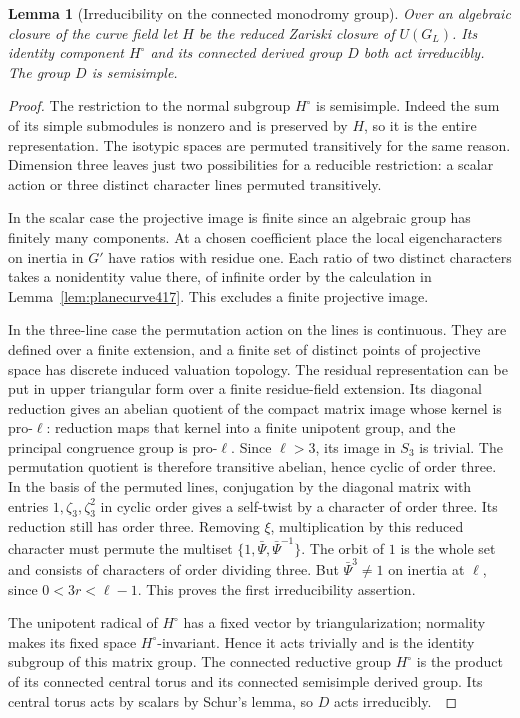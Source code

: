 \documentclass[a4paper,11pt]{article}
\newtheorem{lemma}[proposition]{Lemma}
\theoremstyle{definition}
\theoremstyle{remark}
\numberwithin{equation}{section}
\begin{document}
\begin{lemma}[Irreducibility on the connected monodromy group]\leavevmode
\label{lem:connectedthree418}
Over an algebraic closure of the curve field let \(H\) be the
reduced Zariski closure of \(U(G_L)\). Its identity component
\(H^\circ\) and its connected derived group \(D\) both act
irreducibly. The group \(D\) is semisimple.
\end{lemma}
\begin{proof}
The restriction to the normal subgroup \(H^\circ\) is
semisimple. Indeed the sum of its simple submodules is nonzero
and is preserved by \(H\), so it is the entire representation.
The isotypic spaces are permuted transitively for the same
reason. Dimension three leaves just two possibilities for a
reducible restriction: a scalar action or three distinct
character lines permuted transitively.

In the scalar case the projective image is finite since an
algebraic group has finitely many components. At a chosen
coefficient place the local eigencharacters on inertia in
\(G'\) have ratios with residue one. Each ratio of two distinct
characters takes a nonidentity value there, of infinite order
by the calculation in Lemma~\ref{lem:planecurve417}. This
excludes a finite projective image.

In the three-line case the permutation action on the lines
is continuous. They are defined over a finite extension, and
a finite set of distinct points of projective space has
discrete induced valuation topology. The residual representation
can be put in upper triangular form over a finite residue-field
extension. Its diagonal reduction gives an abelian quotient
of the compact matrix image whose kernel is pro-\(\ell\):
reduction maps that kernel into a finite unipotent group,
and the principal congruence group is pro-\(\ell\).
Since \(\ell>3\), its image in \(S_3\) is trivial. The
permutation quotient is therefore transitive abelian, hence
cyclic of order three. In the basis of the permuted lines,
conjugation by the diagonal matrix with entries
\(1,\zeta_3,\zeta_3^2\) in cyclic order gives a self-twist by
a character of order three. Its reduction still has order
three. Removing \(\xi\), multiplication by this reduced
character must permute the multiset
\(\{1,\bar\Psi,\bar\Psi^{-1}\}\).
The orbit of \(1\) is the whole set and consists of characters
of order dividing three. But \(\bar\Psi^3\ne1\) on inertia
at \(\ell\), since \(0<3r<\ell-1\). This proves the first
irreducibility assertion.

The unipotent radical of \(H^\circ\) has a fixed vector by
triangularization; normality makes its fixed space
\(H^\circ\)-invariant. Hence it acts trivially and is the
identity subgroup of this matrix group. The connected
reductive group \(H^\circ\) is the product of its connected
central torus and its connected semisimple derived group.
Its central torus acts by scalars by Schur's lemma, so \(D\)
acts irreducibly.~\cite{IX-VII-VI-milne122}
\end{proof}
\end{document}
